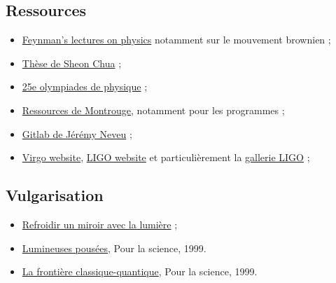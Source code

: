 \documentclass[12pt,a4paper]{article}
\begin{document}
\subsection*{Ressources}

\begin{itemize}
\item \href{https://www.feynmanlectures.caltech.edu/I_toc.html}{Feynman's lectures on physics} notamment sur le mouvement brownien ; 
\item \href{https://www.google.com/url?sa=t&rct=j&q=&esrc=s&source=web&cd=&ved=2ahUKEwjG_46I64rqAhXNzaQKHVsDClg4ChAWMAR6BAgDEAE&url=https\%3A\%2F\%2Fs3.cern.ch\%2Finspire-prod-files-4\%2F47ec074a2c30485f4a7685f9432e2f00&usg=AOvVaw0vEuXse2zJa-8kvqizXVrd}{Thèse de Sheon Chua} ;
\item \href{https://odpf.org/la-xxve-2018.html}{25e olympiades de physique} ;
\item \href{http://ressources.agreg.phys.ens.fr/ressources/}{Ressources de Montrouge}, notamment pour les programmes ;
\item \href{https://gitlab.in2p3.fr/Jeremy}{Gitlab de Jérémy Neveu} ;
\item \href{http://public.virgo-gw.eu/language/fr/}{Virgo website}, \href{https://www.ligo.caltech.edu/}{LIGO website} et particulièrement la \href{https://www.ligo.caltech.edu/gallery}{gallerie LIGO} ;
\end{itemize}

\subsection*{Vulgarisation}

\begin{itemize}
\item \href{https://nanopdf.com/download/refroidir-un-miroir-avec-la-lumiere_pdf}{Refroidir un miroir avec la lumière} ;
\item \href{https://www.pourlascience.fr/sd/physique/lumineuses-poussees-1143.php}{Lumineuses pousées}, Pour la science, 1999.
\item \href{https://www.pourlascience.fr/sd/physique/la-frontiere-classique-quantique-1533.php}{La frontière classique-quantique}, Pour la science, 1999.
\end{itemize}
\end{document}
